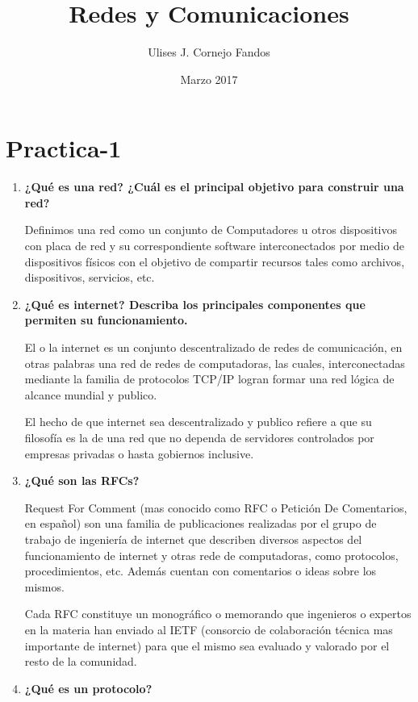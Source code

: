 \documentclass[a4paper,10pt]{article}
\title{Redes y Comunicaciones}
\author{Ulises J. Cornejo Fandos}
\date{Marzo 2017}
\begin{document}
\maketitle

\section{Practica-1}
\begin{enumerate}
    \item \textbf{¿Qué es una red? ¿Cuál es el principal objetivo para construir una red?}
    
    Definimos una red como un conjunto de Computadores u otros dispositivos con placa de red y su correspondiente software interconectados por medio de dispositivos físicos con el objetivo de compartir recursos tales como archivos, dispositivos, servicios, etc. \\
    
    \item \textbf{¿Qué es internet? Describa los principales componentes que permiten su funcionamiento.}
    
    El o la internet es un conjunto descentralizado de redes de comunicación, en otras palabras una red de redes de computadoras, las cuales, interconectadas mediante la familia de protocolos TCP/IP logran formar una red lógica de alcance mundial y publico.

	El hecho de que internet sea descentralizado y publico refiere a que su filosofía es la de una red que no dependa de servidores controlados por empresas privadas o hasta gobiernos inclusive. \\
	
	\item \textbf{¿Qué son las RFCs?}
	
	Request For Comment (mas conocido como RFC o Petición De Comentarios, en español) son una familia de publicaciones realizadas por el grupo de trabajo de ingeniería de internet que describen diversos aspectos del funcionamiento de internet y otras rede de computadoras, como protocolos, procedimientos, etc. Además cuentan con comentarios o ideas sobre los mismos.

	Cada RFC constituye un monográfico o memorando que ingenieros o expertos en la materia han enviado al IETF (consorcio de colaboración técnica mas importante de internet) para que el mismo sea evaluado y valorado por el resto de la comunidad. \\
	
	\item \textbf{¿Qué es un protocolo?}
	

\end{enumerate}
\end{document}
